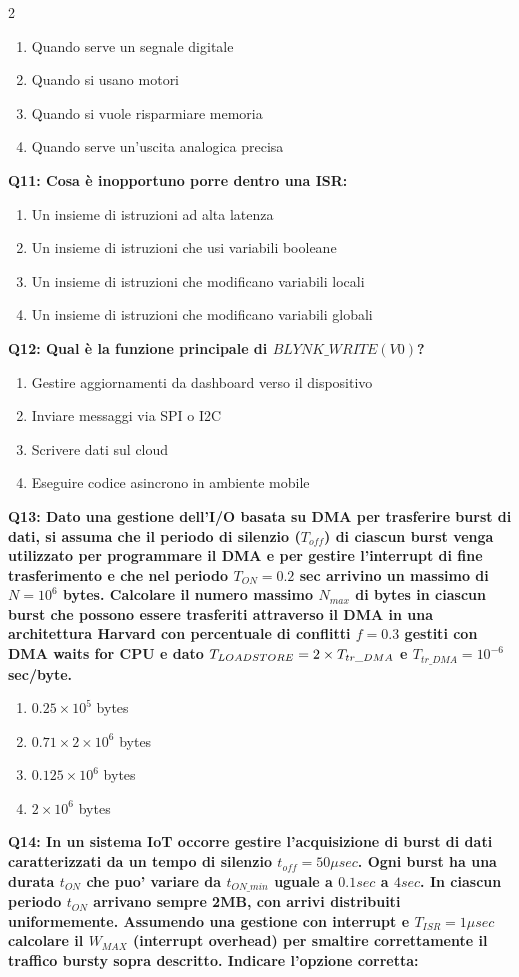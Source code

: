 \documentclass[10pt]{article}
\begin{document}
\begin{multicols}{2}
\begin{enumerate}[label=\arabic*.]
\item Quando serve un segnale digitale
\item Quando si usano motori
\item Quando si vuole risparmiare memoria
\item Quando serve un’uscita analogica precisa
\end{enumerate}
\textbf{Q11: Cosa è inopportuno porre dentro una ISR:}

\begin{enumerate}[label=\arabic*.]
\item Un insieme di istruzioni ad alta latenza
\item Un insieme di istruzioni che usi variabili booleane
\item Un insieme di istruzioni che modificano variabili locali
\item Un insieme di istruzioni che modificano variabili globali
\end{enumerate}
\textbf{Q12: Qual è la funzione principale di $BLYNK\_WRITE(V0)$?}

\begin{enumerate}[label=\arabic*.]
\item Gestire aggiornamenti da dashboard verso il dispositivo
\item Inviare messaggi via SPI o I2C
\item Scrivere dati sul cloud
\item Eseguire codice asincrono in ambiente mobile
\end{enumerate}
\textbf{Q13: Dato una gestione dell’I/O basata su DMA per trasferire burst di dati, si assuma che il periodo di silenzio  ($T_{off}$) di ciascun burst venga utilizzato per programmare il DMA e per gestire l’interrupt di fine trasferimento e che nel periodo $T_{ON} = 0.2$ sec arrivino un massimo di $N=10^6$ bytes. Calcolare il numero massimo $N_{max}$ di bytes in ciascun burst che possono essere trasferiti attraverso il DMA in una architettura Harvard con percentuale di conflitti $f = 0.3$ gestiti con DMA waits for CPU e dato $T_{LOAD\/STORE} = 2 \times T_{tr\_DMA}$ e $T_{tr\_DMA} = 10^{-6}$ sec/byte.}

\begin{enumerate}[label=\arabic*.]
\item $0.25 \times 10^5$ bytes
\item $0.71 \times 2 \times 10^6$ bytes
\item $0.125 \times 10^6$ bytes
\item $2 \times 10^6$ bytes
\end{enumerate}
\textbf{Q14: In un sistema IoT occorre gestire l'acquisizione di burst di dati caratterizzati da un tempo di silenzio $t_{off}=50\mu sec$. Ogni burst ha una durata $t_{ON}$ che puo' variare da $t_{ON\_min}$ uguale a $0.1 sec$ a $4 sec$. In ciascun periodo $t_{ON}$ arrivano sempre 2MB, con arrivi distribuiti uniformemente.  Assumendo una gestione con interrupt e $T_{ISR}=1 \mu sec$ calcolare il $W_{MAX}$ (interrupt overhead) per smaltire correttamente il traffico bursty sopra descritto.  Indicare l'opzione corretta:}


\end{multicols}
\end{document}
